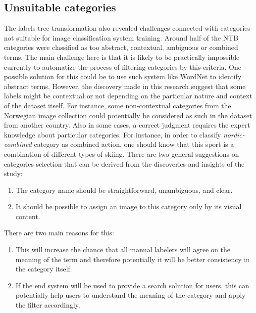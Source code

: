 

\subsection{Unsuitable categories}
The labels tree transformation also revealed challenges connected with categories not suitable for image classification system training. Around half of the NTB categories were classified as too abstract, contextual, ambiguous or combined terms. The main challenge here is that it is likely to be practically impossible currently to automatize the process of filtering categories by this criteria. One possible solution for this could be to use such system like WordNet to identify abstract terms. However, the discovery made in this research suggest that some labels might be contextual or not depending on the particular nature and context of the dataset itself. For instance, some non-contextual categories from the Norwegian image collection could potentially be considered as such in the dataset from another country. Also in some cases, a correct judgment requires the expert knowledge about particular categories. For instance, in order to classify \textit{nordic-combined} category as combined action, one should know that this sport is a combination of different types of skiing. There are two general suggestions on categories selection that can be derived from the discoveries and insights of the study:

\begin{enumerate}
    \item The category name should be straightforward, unambiguous, and clear.
    \item It should be possible to assign an image to this category only by its visual content.
\end{enumerate}

There are two main reasons for this:

\begin{enumerate}
    \item This will increase the chance that all manual labelers will agree on the meaning of the term and therefore potentially it will be better consistency in the category itself.
    \item If the end system will be used to provide a search solution for users, this can potentially help users to understand the meaning of the category and apply the filter accordingly.
\end{enumerate}

